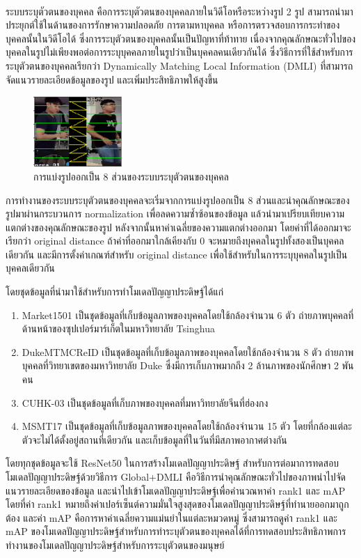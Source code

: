 ระบบระบุตัวตนของบุคคล\textsuperscript{\cite{luo2019alignedreid++}} คือการระบุตัวตนของบุคคลภายในวิดีโอหรือระหว่างรูป 2 รูป สามารถนำมาประยุกต์ใช้ในด้านของการรักษาความปลอดภัย 
การตามหาบุคคล หรือการตรวจสอบการกระทำของบุคคลนั้นในวิดีโอได้ ซึ่งการระบุตัวตนของบุคคลนั้นเป็นปัญหาที่ท้าทาย 
เนื่องจากคุณลักษณะทั่วไปของบุคคลในรูปไม่เพียงพอต่อการระบุบุคคลภายในรูปว่าเป็นบุคคลคนเดียวกันได้ 
ซึ่งวิธีการที่ใช้สำหรับการระบุตัวตนของบุคคลเรียกว่า Dynamically Matching Local Information (DMLI) ที่สามารถจัดแนวรายละเอียดข้อมูลของรูป และเพิ่มประสิทธิภาพให้สูงขึ้น

\begin{figure}[!ht]
	\centering
	\includegraphics[width=0.3\textwidth]{chapter2/images/alignedreid.png}
		\caption{การแบ่งรูปออกเป็น 8 ส่วนของระบบระบุตัวตนของบุคคล}
    	\label{fig:alignedreid}
\end{figure}

การทำงานของระบบระบุตัวตนของบุคคลจะเริ่มจากการแบ่งรูปออกเป็น 8 ส่วนและนำคุณลักษณะของรูปมาผ่านกระบวนการ normalization เพื่อลดความซ้ำซ้อนของข้อมูล 
แล้วนำมาเปรียบเทียบความแตกต่างของคุณลักษณะของรูป หลังจากนั้นหาค่าเฉลี่ยของความแตกต่างออกมา โดยค่าที่ได้ออกมาจะเรียกว่า original distance ถ้าค่าที่ออกมาใกล้เคียงกับ 0 จะหมายถึงบุคคลในรูปทั้งสองเป็นบุคคลเดียวกัน  และมีการตั้งค่าเกณฑ์สำหรับ original distance เพื่อใช้สำหรับในการระบุบุคคลในรูปเป็นบุคคลเดียวกัน


โดยชุดข้อมูลที่นำมาใช้สำหรับการทำโมเดลปัญญาประดิษฐ์ได้แก่
\begin{enumerate}
	\item {Market1501 เป็นชุดข้อมูลที่เก็บข้อมูลภาพของบุคคลโดยใช้กล้องจำนวน 6 ตัว ถ่ายภาพบุคคลที่ด้านหน้าของซุปเปอร์มาร์เก็ตในมหาวิทยาลัย Tsinghua}
	\item{DukeMTMCReID เป็นชุดข้อมูลที่เก็บข้อมูลภาพของบุคคลโดยใช้กล้องจำนวน 8 ตัว ถ่ายภาพบุคคลที่วิทยาเขตของมหาวิทยาลัย Duke ซึ่งมีการเก็บภาพมากถึง 2 ล้านภาพของนักศึกษา 2 พันคน }
	\item{CUHK-03 เป็นชุดข้อมูลที่เก็บภาพของบุคคลที่มหาวิทยาลัยจีนที่ฮ่องกง}
	\item{MSMT17 เป็นชุดข้อมูลที่เก็บข้อมูลภาพของบุคคลโดยใช้กล้องจำนวน 15 ตัว โดยที่กล้องแต่ละตัวจะไม่ได้ตั้งอยู่สถานที่เดียวกัน และเก็บข้อมูลที่ในวันที่มีสภาพอากาศต่างกัน}
\end{enumerate}

โดยทุกชุดข้อมูลจะใช้ ResNet50 ในการสร้างโมเดลปัญญาประดิษฐ์ สำหรับการต่อมาการทดสอบโมเดลปัญญาประดิษฐ์ด้วยวิธีการ Global+DMLI คือวิธีการนำคุณลักษณะทั่วไปของภาพนำไปจัดแนวรายละเอียดของข้อมูล และนำไปเข้าโมเดลปัญญาประดิษฐ์เพื่อคำนวณหาค่า rank1 และ mAP โดยที่ค่า rank1 หมายถึงค่าเปอร์เซ็นต์ความมั่นใจสูงสุดของโมเดลปัญญาประดิษฐ์ที่ทำนายออกมาถูกต้อง และค่า mAP คือการหาค่าเฉลี่ยความแม่นยำในแต่ละหมวดหมู่ ซึ่งสามารถดูค่า rank1 และ mAP ของโมเดลปัญญาประดิษฐ์สำหรับการทำระบุตัวตนของบุคคลได้ที่การทดสอบประสิทธิภาพการทำงานของโมเดลปัญญาประดิษฐ์สำหรับการระบุตัวตนของมนุษย์